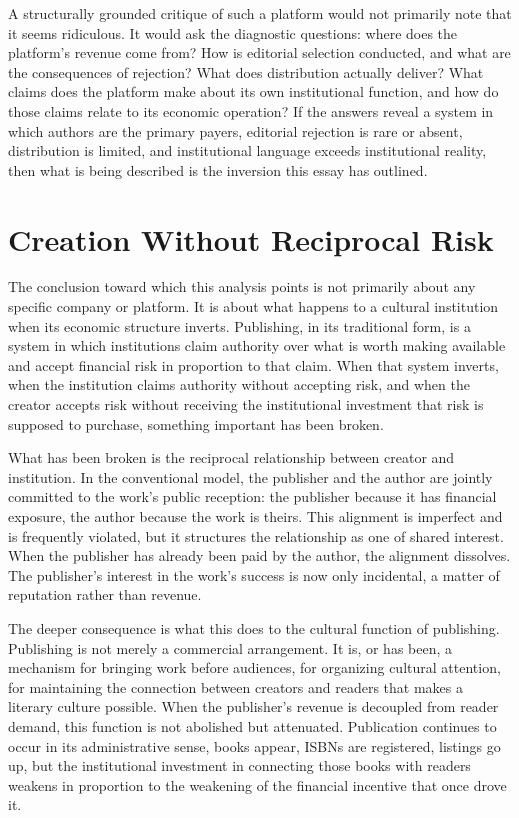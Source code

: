\documentclass[12pt, a4paper]{article}
\begin{document}
A structurally grounded critique of such a platform would not primarily note that it seems ridiculous. It would ask the diagnostic questions: where does the platform's revenue come from? How is editorial selection conducted, and what are the consequences of rejection? What does distribution actually deliver? What claims does the platform make about its own institutional function, and how do those claims relate to its economic operation? If the answers reveal a system in which authors are the primary payers, editorial rejection is rare or absent, distribution is limited, and institutional language exceeds institutional reality, then what is being described is the inversion this essay has outlined.

\section{Creation Without Reciprocal Risk}

The conclusion toward which this analysis points is not primarily about any specific company or platform. It is about what happens to a cultural institution when its economic structure inverts. Publishing, in its traditional form, is a system in which institutions claim authority over what is worth making available and accept financial risk in proportion to that claim. When that system inverts, when the institution claims authority without accepting risk, and when the creator accepts risk without receiving the institutional investment that risk is supposed to purchase, something important has been broken.

What has been broken is the reciprocal relationship between creator and institution. In the conventional model, the publisher and the author are jointly committed to the work's public reception: the publisher because it has financial exposure, the author because the work is theirs. This alignment is imperfect and is frequently violated, but it structures the relationship as one of shared interest. When the publisher has already been paid by the author, the alignment dissolves. The publisher's interest in the work's success is now only incidental, a matter of reputation rather than revenue.

The deeper consequence is what this does to the cultural function of publishing. Publishing is not merely a commercial arrangement. It is, or has been, a mechanism for bringing work before audiences, for organizing cultural attention, for maintaining the connection between creators and readers that makes a literary culture possible. When the publisher's revenue is decoupled from reader demand, this function is not abolished but attenuated. Publication continues to occur in its administrative sense, books appear, ISBNs are registered, listings go up, but the institutional investment in connecting those books with readers weakens in proportion to the weakening of the financial incentive that once drove it.
\end{document}
